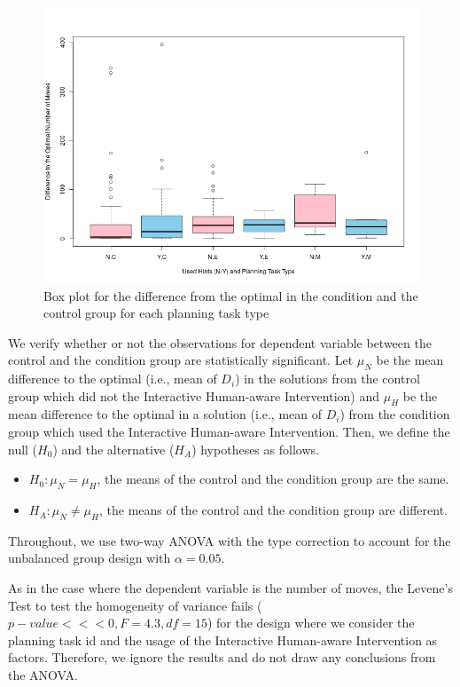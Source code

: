 \begin{figure}[tpb]
  \centering
\includegraphics[width=0.9\columnwidth]{img/lenoptbytype.png}
  \caption{Box plot for the difference from the optimal in the condition and the control group for each planning task type}
  \label{fig:lenoptbytype}
\end{figure}

We verify whether or not the observations for dependent variable between the control and the condition group are statistically significant.
Let $\mu_N$ be the mean difference to the optimal (i.e., mean of $D_i$) in the solutions from the control group which did not the Interactive Human-aware Intervention) and $\mu_H$ be the mean difference to the optimal in a solution (i.e., mean of $D_i$) from the condition group which used the Interactive Human-aware Intervention.
Then, we define the null ($H_0$) and the alternative ($H_A$) hypotheses as follows.
\begin{itemize}
\item $H_0: \mu_N = \mu_H$, the means of the control and the condition group are the same.
\item $H_A: \mu_N \neq \mu_H$, the means of the control and the condition group are different.
\end{itemize}
Throughout, we use two-way ANOVA with the type  correction to account for the unbalanced group design with $\alpha=0.05$.

As in the case where the dependent variable is the number of moves, the Levene's Test to test the homogeneity of variance fails ($p-value<<< 0, F=4.3, df=15$) for the design where we consider the planning task id and the usage of the Interactive Human-aware Intervention as factors.
Therefore, we ignore the results and do not draw any conclusions from the ANOVA.

